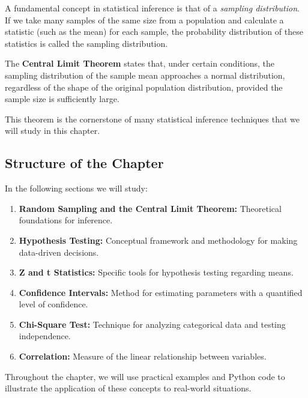 A fundamental concept in statistical inference is that of a \emph{sampling distribution}. If we take many samples of the same size from a population and calculate a statistic (such as the mean) for each sample, the probability distribution of these statistics is called the sampling distribution.

The \textbf{Central Limit Theorem} states that, under certain conditions, the sampling distribution of the sample mean approaches a normal distribution, regardless of the shape of the original population distribution, provided the sample size is sufficiently large.

This theorem is the cornerstone of many statistical inference techniques that we will study in this chapter.

\subsection*{Structure of the Chapter}

In the following sections we will study:

\begin{enumerate}
	\item \textbf{Random Sampling and the Central Limit Theorem:} Theoretical foundations for inference.
	\item \textbf{Hypothesis Testing:} Conceptual framework and methodology for making data-driven decisions.
	\item \textbf{Z and t Statistics:} Specific tools for hypothesis testing regarding means.
	\item \textbf{Confidence Intervals:} Method for estimating parameters with a quantified level of confidence.
	\item \textbf{Chi-Square Test:} Technique for analyzing categorical data and testing independence.
	\item \textbf{Correlation:} Measure of the linear relationship between variables.
\end{enumerate}

Throughout the chapter, we will use practical examples and Python code to illustrate the application of these concepts to real-world situations.
